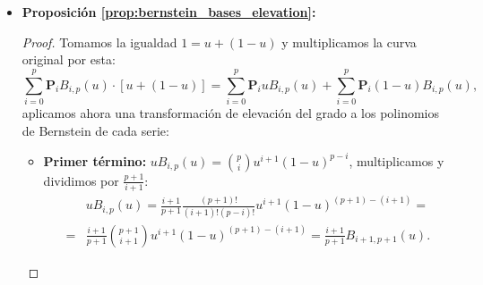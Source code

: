 \documentclass[11pt]{book}
\theoremstyle{plain} %
\theoremstyle{definition} %
\theoremstyle{definition} %
\begin{document}
\begin{itemize}
\begin{proof}
        Procedemos ahora por inducción sobre $p$:
        \begin{itemize}
            \item \textbf{Caso base ($p=1$):} $\hat{U}=\{0,0,1,1\}$
            \begin{itemize}
                \item $N_{0,1}(\hat{u}) = (1-\hat{u}) N_{1,0}(\hat{u})=1-\hat{u}$.
               \item $N_{1,1}(\hat{u}) = \hat{u}N_{1,0}(\hat{u})=\hat{u}$.
            \end{itemize}
            Ambas coinciden con $B_{0,1}(\hat{u})$ y $B_{1,1}(\hat{u})$ respectivamente.
            \item \textbf{Paso de inducción sobre $p$:} asumimos cierta la equivalencia para $p-1$, luego:
            $$N_{i,p}(\hat{u}) = \hat{u} \left[ \binom{p-1}{i} \hat{u}^i (1-\hat{u})^{p-1-i} \right] + (1-\hat{u}) \left[ \binom{p-1}{i-1} \hat{u}^{i-1} (1-\hat{u})^{p-i} \right],$$
            factorizamos el término común $\hat{u}^i (1-\hat{u})^{p-i}$:
            $$N_{i,p}(\hat{u}) = \left[ \binom{p-1}{i} + \binom{p-1}{i-1} \right] \hat{u}^i (1-\hat{u})^{p-i},$$
            por último aplicamos ahora la \textbf{identidad de Pascal}:
            $$N_{i,p}(\hat{u}) = \binom{p}{i} \hat{u}^i (1-\hat{u})^{p-i} = B_{i,p}(\hat{u}).$$
        \end{itemize}
    \end{proof}
    \item \textbf{Proposición \ref{prop:bernstein_bases_elevation}:}
    \begin{proof}
        Tomamos la igualdad $1=u +(1-u)$ y multiplicamos la curva original por esta:
        $$\sum_{i=0}^p \mathbf{P}_i B_{i,p}(u) \cdot \left[ u + (1-u) \right] = \sum_{i=0}^p \mathbf{P}_i u B_{i,p}(u) + \sum_{i=0}^p \mathbf{P}_i (1-u) B_{i,p}(u),$$
        aplicamos ahora una transformación de elevación del grado a los polinomios de Bernstein de cada serie:
        \begin{itemize}
            \item \textbf{Primer término:} $u B_{i,p}(u) = \binom{p}{i} u^{i+1} (1-u)^{p-i}$, multiplicamos y dividimos por $\frac{p+1}{i+1}$:
                \begin{align*}
                    &u B_{i,p}(u) = \frac{i+1}{p+1} \frac{(p+1)!}{(i+1)! (p-i)!} u^{i+1} (1-u)^{(p+1)-(i+1)}=\\
                    =&\frac{i+1}{p+1} \binom{p+1}{i+1} u^{i+1} (1-u)^{(p+1)-(i+1)} = \frac{i+1}{p+1} B_{i+1, p+1}(u).

\end{align*}
\end{itemize}
\end{proof}
\end{itemize}
\end{document}
